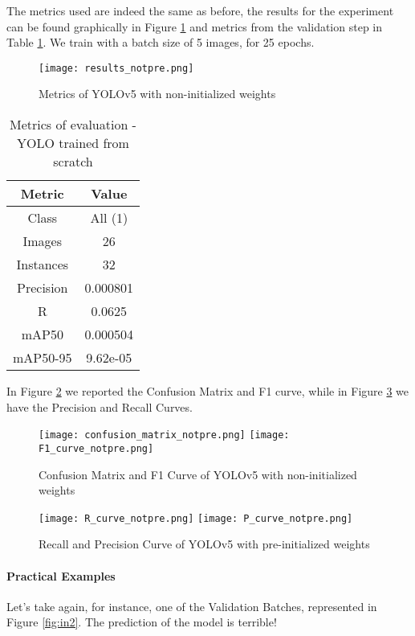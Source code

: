 The metrics used are indeed the same as before, the results for the experiment can be found graphically in Figure \ref{fig:resultsyolonot} and metrics from the validation step in Table \ref{tab:table3}. We train with a batch size of 5 images, for 25 epochs.

\begin{figure}[h!]
  \centering
  \texttt{[image: results\_notpre.png]}
  \caption{Metrics of YOLOv5 with non-initialized weights}
  \label{fig:resultsyolonot}
\end{figure}

\begin{table}[h!]
    \centering
    \begin{tabular}{c|c}
    Metric & Value \\
    \hline
    Class & All (1)\\
    Images & 26 \\
    Instances & 32\\
    Precision & 0.000801 \\  
    R & 0.0625 \\
    mAP50 & 0.000504\\
    mAP50-95 & 9.62e-05\\
    \end{tabular}
    \caption{Metrics of evaluation - YOLO trained from scratch}
    \label{tab:table3}
\end{table}	

In Figure \ref{fig:Cmatrix_not} we reported the Confusion Matrix and F1 curve, while in Figure \ref{fig:RPCurve_not} we have the Precision and Recall Curves.

\begin{figure}[h!]
  \centering
  \texttt{[image: confusion\_matrix\_notpre.png]}
  \texttt{[image: F1\_curve\_notpre.png]}
  \caption{Confusion Matrix and F1 Curve of YOLOv5 with non-initialized weights}
  \label{fig:Cmatrix_not}
\end{figure}

\begin{figure}[h!]
  \centering
  \texttt{[image: R\_curve\_notpre.png]}
  \texttt{[image: P\_curve\_notpre.png]}
  \caption{Recall and Precision Curve of YOLOv5 with pre-initialized weights}
  \label{fig:RPCurve_not}
\end{figure}


\paragraph{Practical Examples}
Let's take again, for instance, one of the Validation Batches, represented in Figure \ref{fig:in2}. The prediction of the model is terrible!

